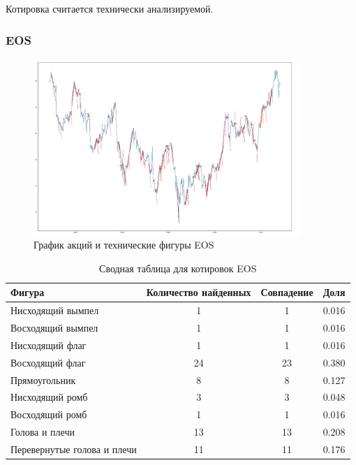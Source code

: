 \documentclass[bachelor, och, coursework]{SCWorks}
\begin{document}
        Котировка считается технически анализируемой.

        \subsubsection{EOS}
    
        \begin{figure}[H]
            \centering
            \includegraphics[width=0.9\textwidth]{pic/EOS.jpg}
            \caption{График акций и технические фигуры EOS}
        \end{figure}
       
        \begin{table}[!hbt]
            \caption{Сводная таблица для котировок EOS}
            \centering
            \begin{tabular}{|l|c|c|c|}
            \hline
            Фигура                      & \multicolumn{1}{l|}{Количество найденных} & Совпадение & Доля  \\ \hline
            Нисходящий вымпел           & 1                                         & 1          & 0.016 \\ \hline
            Восходящий вымпел           & 1                                         & 1          & 0.016 \\ \hline
            Нисходящий флаг             & 1                                         & 1          & 0.016 \\ \hline
            Восходящий флаг             & 24                                        & 23         & 0.380 \\ \hline
            Прямоугольник               & 8                                         & 8          & 0.127 \\ \hline
            Нисходящий ромб             & 3                                         & 3          & 0.048 \\ \hline
            Восходящий ромб             & 1                                         & 1          & 0.016 \\ \hline
            Голова и плечи              & 13                                        & 13         & 0.208 \\ \hline
            Перевернутые голова и плечи & 11                                        & 11         & 0.176 \\ \hline
            \end{tabular}  
        \end{table}
        
\end{document}
